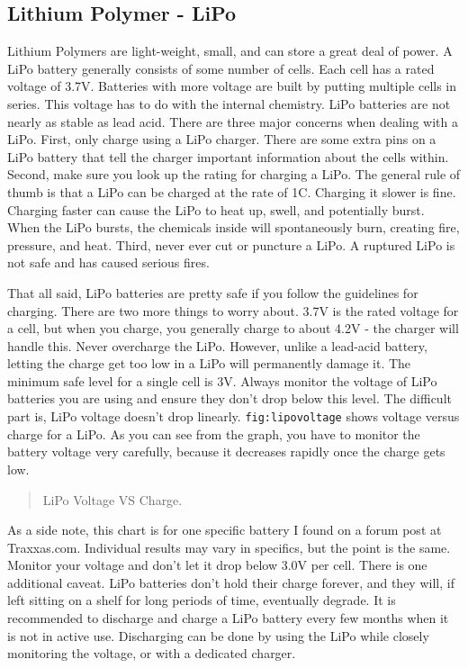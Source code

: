 \hypertarget{lithium-polymer---lipo}{%
\subsection{Lithium Polymer - LiPo}\label{lithium-polymer---lipo}}

Lithium Polymers are light-weight, small, and can store a great deal of
power. A LiPo battery generally consists of some number of cells. Each
cell has a rated voltage of 3.7V. Batteries with more voltage are built
by putting multiple cells in series. This voltage has to do with the
internal chemistry. LiPo batteries are not nearly as stable as lead
acid. There are three major concerns when dealing with a LiPo. First,
only charge using a LiPo charger. There are some extra pins on a LiPo
battery that tell the charger important information about the cells
within. Second, make sure you look up the rating for charging a LiPo.
The general rule of thumb is that a LiPo can be charged at the rate of
1C. Charging it slower is fine. Charging faster can cause the LiPo to
heat up, swell, and potentially burst. When the LiPo bursts, the
chemicals inside will spontaneously burn, creating fire, pressure, and
heat. Third, never ever cut or puncture a LiPo. A ruptured LiPo is not
safe and has caused serious fires.

That all said, LiPo batteries are pretty safe if you follow the
guidelines for charging. There are two more things to worry about. 3.7V
is the rated voltage for a cell, but when you charge, you generally
charge to about 4.2V - the charger will handle this. Never overcharge
the LiPo. However, unlike a lead-acid battery, letting the charge get
too low in a LiPo will permanently damage it. The minimum safe level for
a single cell is 3V. Always monitor the voltage of LiPo batteries you
are using and ensure they don't drop below this level. The difficult
part is, LiPo voltage doesn't drop linearly. \texttt{fig:lipovoltage}
shows voltage versus charge for a LiPo. As you can see from the graph,
you have to monitor the battery voltage very carefully, because it
decreases rapidly once the charge gets low.

\begin{quote}
LiPo Voltage VS Charge.
\end{quote}

As a side note, this chart is for one specific battery I found on a
forum post at Traxxas.com. Individual results may vary in specifics, but
the point is the same. Monitor your voltage and don't let it drop below
3.0V per cell. There is one additional caveat. LiPo batteries don't hold
their charge forever, and they will, if left sitting on a shelf for long
periods of time, eventually degrade. It is recommended to discharge and
charge a LiPo battery every few months when it is not in active use.
Discharging can be done by using the LiPo while closely monitoring the
voltage, or with a dedicated charger.

